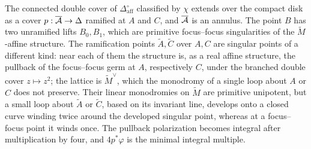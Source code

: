 \begin{theorem}\label{thm:parity-cover}
The connected double cover of $\Delta_{\mathrm{aff}}^\circ$ classified by
$\chi$ extends over the compact disk as a cover
$p:\overline{\mathcal A}\to\Delta$ ramified at $A$ and $C$, and $\overline{\mathcal A}$ is
an annulus.  The point $B$ has two unramified lifts $B_0,B_1$, which are
primitive focus--focus singularities of the $\widetilde M$-affine structure.
The ramification points $\widetilde A,\widetilde C$ over $A,C$ are singular
points of a different kind: near each of them the structure is, as a real
affine structure, the pullback of the focus--focus germ at $A$, respectively
$C$, under the branched double cover $z\mapsto z^2$; the lattice is
$\widetilde M^\vee$, which the monodromy of a single loop about $A$ or $C$
does not preserve.  Their linear monodromies on $\widetilde M$ are
primitive unipotent, but a small loop about $\widetilde A$ or $\widetilde C$,
based on its invariant line, develops onto a closed curve winding twice around the developed singular
point, whereas at a focus--focus point it winds once.  The pullback
polarization becomes integral after multiplication by four, and
$4p^*\varphi$ is the minimal integral multiple.
\end{theorem}

